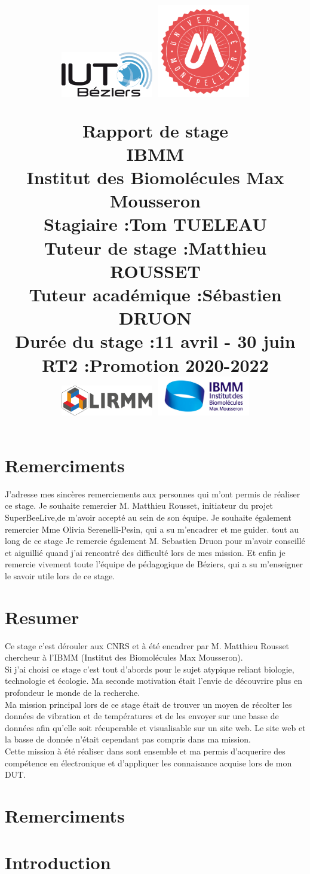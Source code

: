 \documentclass[12pt,french,a4paper]{article}
\title{
	\bigskip
 \centering
         \includegraphics[width=4cm]{../../../logo/IUTlogo.png}  \hspace{7cm}
         \includegraphics[width=4cm]{../../../logo/UMlogo.png}  \hspace{7cm}

	\LARGE{Rapport de stage}
	\\
	\LARGE{IBMM}
	\\
	\large{\textbf{Institut des Biomolécules Max Mousseron}}
	\\
	\large{Stagiaire :\textbf{Tom TUELEAU}}
	\\
	\large{Tuteur de stage :\textbf{Matthieu ROUSSET}}
	\\
	\large{Tuteur académique :\textbf{Sébastien DRUON}}
	\\
	\large{Durée du stage :\textbf{11 avril - 30 juin}}
	\\
	\large{RT2 :Promotion 2020-2022}
	\\
         \includegraphics[width=4cm]{../../../logo/LIRMMlogo.png}  \hspace{7cm}
         \includegraphics[width=4cm]{../../../logo/IBMMlogo.jpg}  \hspace{7cm}
}
\author{
	\date{}
}
\begin{document}
\maketitle

\section*{Remerciments}
J’adresse mes sincères remerciements aux personnes qui m’ont permis de réaliser ce stage.
Je souhaite remercier M. Matthieu Rousset, initiateur du projet SuperBeeLive,de m’avoir accepté au sein de son équipe.
Je souhaite également remercier Mme Olivia Serenelli-Pesin, qui a su m’encadrer et me guider. tout au long de ce stage
Je remercie également M. Sebastien Druon pour m’avoir conseillé et aiguillié quand j'ai rencontré des difficulté lors de mes mission.
Et enfin je remercie vivement toute l’équipe de pédagogique de Béziers, qui a su m'enseigner le savoir utile lors de ce stage.

\section*{Resumer}
Ce stage c'est dérouler aux CNRS et à été encadrer par M. Matthieu Rousset chercheur à l'IBMM (Institut des Biomolécules Max Mousseron). \\
Si j'ai choisi ce stage c'est tout d'abords pour le sujet atypique reliant biologie, technologie et écologie. Ma seconde motivation était l'envie de découvrire plus en profondeur le monde de la recherche.\\ 
Ma mission principal lors de ce stage était de trouver un moyen de récolter les données de vibration et de températures et de les envoyer sur une basse de données afin qu'elle soit récuperable et visualisable sur un site web. Le site web et la basse de donnée n'était cependant pas compris dans ma mission. \\
Cette mission à été réaliser dans sont ensemble et ma permis d'acquerire des compétence en électronique et d'appliquer les connaisance acquise lors de mon DUT. 
\section*{Remerciments}
\tableofcontents

\section{Introduction}
\end{document}
